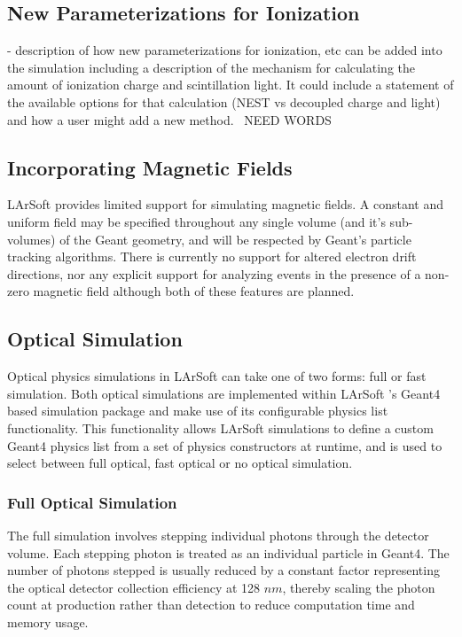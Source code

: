 \documentclass[12pt]{elsarticle}
\newcommand{\larsoft}{LArSoft }
\begin{document}
\subsection{New Parameterizations for Ionization}
\label{sec:ionization}
- description of how new parameterizations for ionization, etc can be added into the simulation including a description of the mechanism for calculating the amount of ionization charge and scintillation light.  It could include a statement of the available options for that calculation (NEST vs decoupled charge and light) and how a user might add a new method.~\cite{nest}
NEED WORDS

\subsection{Incorporating Magnetic Fields}
\larsoft provides limited support for simulating magnetic
fields. A constant and uniform field may be specified
throughout any single volume (and it's sub-volumes) of the Geant
geometry, and will be respected by Geant's particle tracking
algorithms. There is currently no support for altered electron
drift directions, nor any explicit support for analyzing events
in the presence of a non-zero magnetic field although both of these features are planned.

\subsection{Optical Simulation}
Optical physics simulations in \larsoft can take one of two forms: full or fast simulation.  Both optical simulations are implemented within \larsoft's Geant4 based simulation package and make use of its configurable physics list functionality.  This functionality allows \larsoft simulations to define a custom Geant4 physics list from a set of physics constructors at runtime, and is used to select between full optical, fast optical or no optical simulation. 

\subsubsection{Full Optical Simulation}
The full simulation involves stepping individual photons through the detector volume.  Each stepping photon is treated as an individual particle in Geant4.  The number of photons stepped is usually reduced by a constant factor representing the optical detector collection efficiency at 128 $nm$, thereby scaling the photon count at production rather than detection to reduce computation time and memory usage. 
\end{document}
